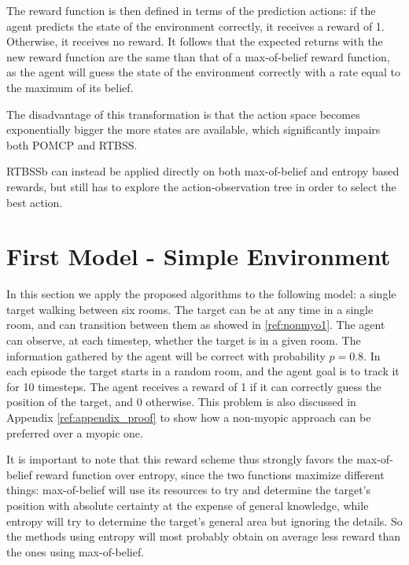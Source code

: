 The reward function is then defined in terms of the prediction actions: if the agent predicts the
state of the environment correctly, it receives a reward of 1. Otherwise, it receives no reward. It
follows that the expected returns with the new reward function are the same than that of a
max-of-belief reward function, as the agent will guess the state of the environment correctly with a
rate equal to the maximum of its belief.


The disadvantage of this transformation is that the action space becomes exponentially bigger the
more states are available, which significantly impairs both POMCP and RTBSS.

RTBSSb can instead be applied directly on both max-of-belief and entropy based rewards, but still
has to explore the action-observation tree in order to select the best action.

\section{First Model - Simple Environment}

In this section we apply the proposed algorithms to the following model: a single target walking
between six rooms. The target can be at any time in a single room, and can transition between them
as showed in \ref{ref:nonmyo1}. The agent can observe, at each timestep, whether the target is in a
given room. The information gathered by the agent will be correct with probability $p=0.8$. In each
episode the target starts in a random room, and the agent goal is to track it for 10 timesteps.  The
agent receives a reward of 1 if it can correctly guess the position of the target, and 0 otherwise.
This problem is also discussed in Appendix \ref{ref:appendix_proof} to show how a non-myopic
approach can be preferred over a myopic one.

It is important to note that this reward scheme thus strongly favors the max-of-belief reward
function over entropy, since the two functions maximize different things: max-of-belief will use its
resources to try and determine the target's position with absolute certainty at the expense of
general knowledge, while entropy will try to determine the target's general area but ignoring the
details. So the methods using entropy will most probably obtain on average less reward than the ones
using max-of-belief.

